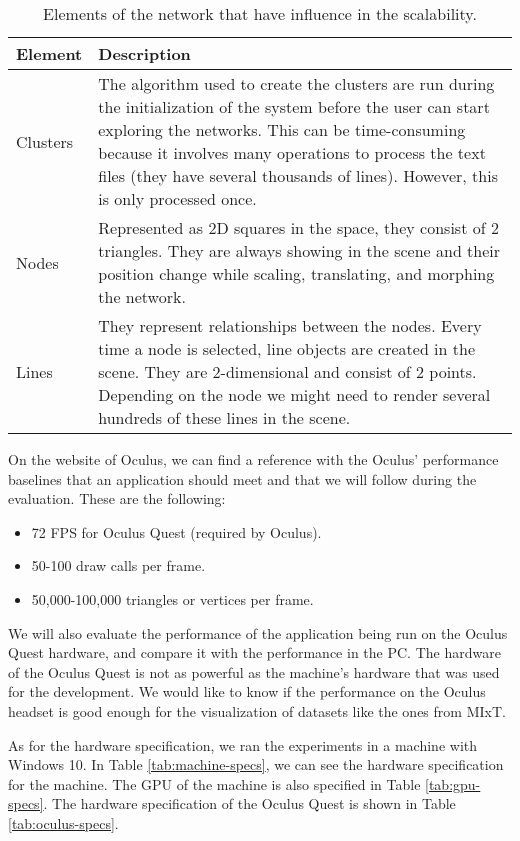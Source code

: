 \begin{table}[h!]
\centering
\begin{tabular}{l p{9cm}}
\hline
Element & Description \\
\hline
Clusters & The algorithm used to create the clusters are run during the initialization of the system before the user can start exploring the networks. This can be time-consuming because it involves many operations to process the text files (they have several thousands of lines). However, this is only processed once. \\
Nodes & Represented as 2D squares in the space, they consist of 2 triangles. They are always showing in the scene and their position change while scaling, translating, and morphing the network.  \\
Lines & They represent relationships between the nodes. Every time a node is selected, line objects are created in the scene. They are 2-dimensional and consist of 2 points. Depending on the node we might need to render several hundreds of these lines in the scene. \\
\end{tabular}
\caption{Elements of the network that have influence in the scalability.}
\label{tab:network-elements}
\end{table}

On the website of Oculus, we can find a reference with the Oculus' performance baselines that an application should meet \cite{oculus_performance_baselines} and that we will follow during the evaluation. These are the following:
\begin{itemize}
  \item 72 FPS for Oculus Quest (required by Oculus).
  \item 50-100 draw calls per frame.
  \item 50,000-100,000 triangles or vertices per frame.
\end{itemize}

We will also evaluate the performance of the application being run on the Oculus Quest hardware, and compare it with the performance in the PC. The hardware of the Oculus Quest is not as powerful as the machine's hardware that was used for the development. We would like to know if the performance on the Oculus headset is good enough for the visualization of datasets like the ones from MIxT.

As for the hardware specification, we ran the experiments in a machine with Windows 10. In Table \ref{tab:machine-specs}, we can see the hardware specification for the machine. The GPU of the machine is also specified in Table \ref{tab:gpu-specs}. The hardware specification of the Oculus Quest is shown in Table \ref{tab:oculus-specs}.

